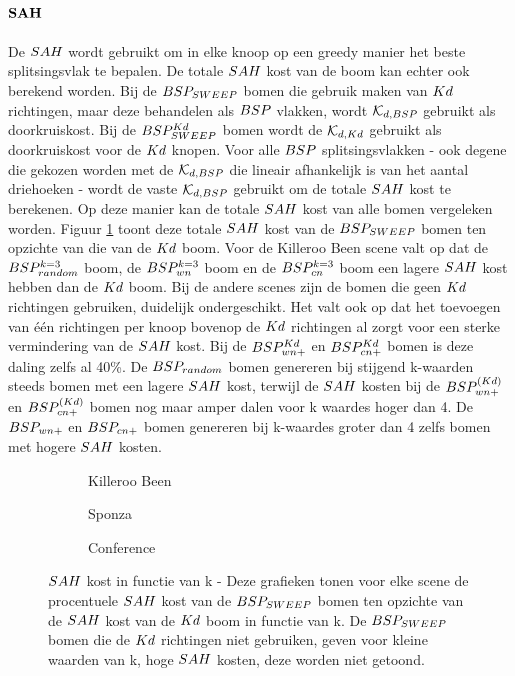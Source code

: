 \paragraph{$\mathbf{SAH}$}
De $\symSAH$ wordt gebruikt om in elke knoop op een greedy manier het beste splitsingsvlak te bepalen. De totale $\symSAH$ kost van de boom kan echter ook berekend worden. Bij de $BSP_{SWEEP}$ bomen die gebruik maken van $Kd$ richtingen, maar deze behandelen als $BSP$ vlakken, wordt $\mathcal{K}_{d,BSP}$ gebruikt als doorkruiskost. Bij de $BSP^{Kd}_{SWEEP}$ bomen wordt de $\mathcal{K}_{d,Kd}$ gebruikt als doorkruiskost voor de $Kd$ knopen. Voor alle $BSP$ splitsingsvlakken - ook degene die gekozen worden met de $\mathcal{K}_{d,BSP}$ die lineair afhankelijk is van het aantal driehoeken - wordt de vaste $\mathcal{K}_{d,BSP}$ gebruikt om de totale $\symSAH$ kost te berekenen.
Op deze manier kan de totale $\symSAH$ kost van alle bomen vergeleken worden.
Figuur \ref{fig:k-sah} toont deze totale $\symSAH$ kost van de $BSP_{SWEEP}$ bomen ten opzichte van die van de $Kd$ boom. 
Voor de Killeroo Been scene valt op dat de $BSP_{random}^{k=3}$ boom, de $BSP_{wn}^{k=3}$ boom en de $BSP_{cn}^{k=3}$ boom een lagere $\symSAH$ kost hebben dan de $Kd$ boom.
Bij de andere scenes zijn de bomen die geen $Kd$ richtingen gebruiken, duidelijk ondergeschikt.
Het valt ook op dat het toevoegen van één richtingen per knoop bovenop de $Kd$ richtingen al zorgt voor een sterke vermindering van de $\symSAH$ kost.
Bij de $BSP^{Kd}_{wn+}$ en $BSP^{Kd}_{cn+}$ bomen is deze daling zelfs al 40\%.
De $BSP_{random}$ bomen genereren bij stijgend k-waarden steeds bomen met een lagere $\symSAH$ kost, terwijl de $\symSAH$ kosten bij de $BSP^{(Kd)}_{wn+}$ en $BSP^{(Kd)}_{cn+}$ bomen nog maar amper dalen voor k waardes hoger dan 4. De $BSP_{wn+}$ en $BSP_{cn+}$ bomen genereren bij k-waardes groter dan 4 zelfs bomen met hogere $\symSAH$ kosten. 


\begin{figure}[h]
  \centering
  \begin{subfigure}[t]{.32\linewidth}
    \centering
{}
\caption{Killeroo Been}
  \end{subfigure}
  \begin{subfigure}[t]{.32\linewidth}
    \centering
{}
\caption{Sponza}
\end{subfigure}
\begin{subfigure}[t]{.32\linewidth}
  \centering
{}
\caption{Conference}
\end{subfigure}
\caption[$\symSAH$ kost in functie van k]{$\symSAH$ kost in functie van k - \small Deze grafieken tonen voor elke scene de procentuele $\symSAH$ kost van de $BSP_{SWEEP}$ bomen ten opzichte van de $\symSAH$ kost van de $Kd$ boom in functie van k. De $BSP_{SWEEP}$ bomen die de $Kd$ richtingen niet gebruiken, geven voor kleine waarden van k, hoge $\symSAH$ kosten, deze worden niet getoond.}
\label{fig:k-sah}
\end{figure}

